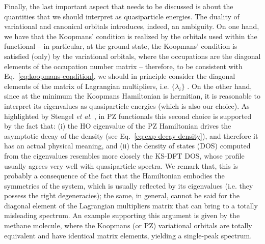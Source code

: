 Finally, the last important aspect that needs to be discussed is about the quantities that we should interpret as quasiparticle energies. The duality of variational and canonical orbitals introduces, indeed, an ambiguity. On one hand, we have that the Koopmans' condition is realized by the orbitals used within the functional -- in particular, at the ground state, the Koopmans' condition is satisfied (only) by the variational orbitals, where the occupations are the diagonal elements of the occupation number matrix -- therefore, to be consistent with Eq.~\eqref{eq:koopmans-condition}, we should in principle consider the diagonal elements of the matrix of Lagrangian multipliers, i.e. $\{ \lambda_i \}$ \cite{vydrov_tests_2007}. On the other hand, since at the minimum the Koopmans Hamiltonian is hermitian, it is reasonable to interpret its eigenvalues as quasiparticle energies (which is also our choice). As highlighted by Stengel \emph{et al.} \cite{stengel_self-interaction_2008}, in PZ functionals this second choice is supported by the fact that: (i) the HO eigenvalue of the PZ Hamiltonian drives the asymptotic decay of the density (see Eq.~\eqref{eq:exp-decay-density}), and therefore it has an actual physical meaning, and (ii) the density of states (DOS) computed from the eigenvalues resembles more closely the KS-DFT DOS, whose profile usually agrees very well with quasiparticle spectra. We remark that, this is probably a consequence of the fact that the Hamiltonian embodies the symmetries of the system, which is usually reflected by its eigenvalues (i.e. they possess the right degeneracies); the same, in general, cannot be said for the diagonal element of the Lagrangian multipliers matrix that can bring to a totally misleading spectrum. An example supporting this argument is given by the methane molecule, where the Koopmans (or PZ) variational orbitals are totally equivalent and have identical matrix elements, yielding a single-peak spectrum.

